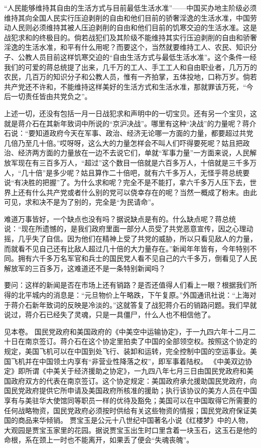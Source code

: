 “人民能够维持其自由的生活方式与目前最低生活水准”——中国买办地主阶级必须维持其向全国人民实行压迫剥削的自由和他们目前的骄奢淫逸的生活水准，中国劳动人民则必须维持其被人压迫剥削的自由和他们目前的饥寒交迫的生活水准。这是战犯求和的终极目的。倘若战犯们及其阶级不能维持其实行压迫剥削的自由和骄奢淫逸的生活水准，和平有什么用呢？而要这个，当然就要维持工人、农民、知识分子、公教人员目前这样饥寒交迫的“自由生活方式与最低生活水准”。这个条件一经我们的可爱的蒋总统提了出来，几千万的工人、手工工人和自由职业者，几万万的农民，几百万的知识分子和公教人员，惟有一齐拍掌，五体投地，口称万岁。倘若共产党还不许和，不能维持这样美好的生活方式和生活水准，那就罪该万死，“今后一切责任皆由共党负之”。

上述一切，还没有包括一月一日战犯求和声明中的一切宝贝。还有另一个宝贝，这就是蒋介石在其新年致词中所说的“京沪决战”。哪里有这种“决战”的力量呢？蒋介石说：“要知道政府今天在军事、政治、经济无论哪一方面的力量，都要超过共党几倍乃至几十倍。”哎呀呀，这么大的力量怎样会不叫人们吓得要死呢？姑且把政治、经济两方面的力量放在一边不去说它们，单就“军事力量”一方面来说，人民解放军现在有三百多万人，“超过”这个数目一倍就是六百多万人，十倍就是三千多万人，“几十倍”是多少呢？姑且算作二十倍吧，就有六千多万人，无怪乎蒋总统要说“有决胜的把握”了。为什么求和呢？完全不是不能打，拿六千多万人压下去，世界上还有什么共产党或者什么别的党可以侥幸存在的呢？当然一概成了粉末。由此可见，求和决不是为了别的，完全是“为民请命”。

难道万事皆好，一个缺点也没有吗？据说缺点是有的。什么缺点呢？蒋总统说：“现在所遗憾的，是我们政府里面一部分人员受了共党恶意宣传，因之心理动摇，几乎失了自信。因为他们在精神上受了共党的威胁，所以只看见敌人的力量，而就看不见自己还有比敌人超过几十倍的大力量存在。”新闻年年皆有，今年特别不同。拥有六千多万名军官和兵士的国民党人看不见自己的六千多万，倒看见了人民解放军的三百多万，这难道还不是一条特别新闻吗？

要问：这样的新闻是否在市场上还有销路？是否还值得人们看上一眼？根据我们所得的北平城内的消息是：“元旦物价上午略跌，下午复原。”外国通讯社说：“上海对于蒋介石新年致词的反映是冷淡的。”这就答复了战犯蒋介石的销路问题。我们早就说过，蒋介石已经失了灵魂，只是一具僵尸，什么人也不相信他了。


\begin{maonote}
见本卷。
国民党政府和美国政府的《中美空中运输协定》，于一九四六年十二月二十日在南京签订。蒋介石在这个协定里拍卖了中国的全部领空权。按照这个协定的规定，美国飞机可以在中国到处飞行、装卸和运转，完全控制中国的空运事业。美国飞机并在中国领土内享有“非营业性降落之权”，即军事着陆权。
《中美双边协定》即所谓《中美关于经济援助之协定》，一九四八年七月三日由国民党政府和美国政府双方的代表在南京签订。这个协定规定：美国政府承允援助国民党政府，向国民党政府提供它所申请及美国政府所核准的援助；执行该协议的美方人员在中国享有与美驻华大使馆同等职员一样的优待及豁免；美国可以在中国取得它所需要的任何战略物资，国民党政府必须按时供给有关这些物资的情报；国民党政府保证美国的商品来华倾销。
贾宝玉是公元十八世纪中国著名小说《红楼梦》中的人物，大观园是贾宝玉家里的花园。据说贾宝玉出生时口里含着一块玉石，这玉石是他的命根，系在颈上一时也不能离开，如果丢了便会“失魂丧魄”。
\end{maonote}
